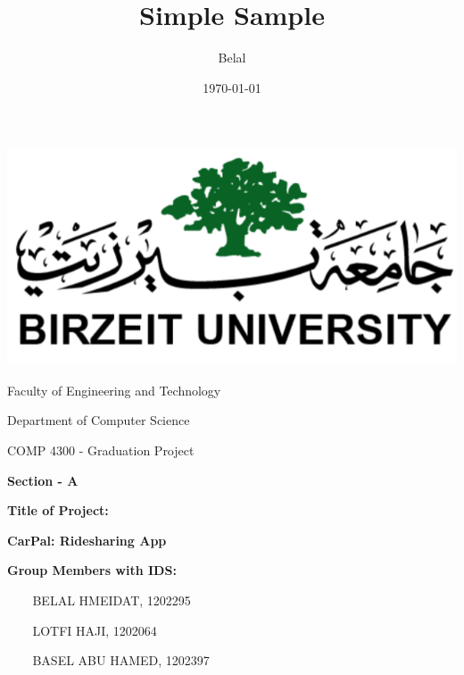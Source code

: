 \documentclass[a4paper, 12pt]{report} %
\title{Simple Sample} %
\author{Belal} %
\date{\today} %
\begin{document}
 
\setlength{\cftbeforetoctitleskip}{0pt plus 1pt} %
\setlength{\cftbeforeloftitleskip}{0pt plus 1pt} %
\setlength{\cftbeforelottitleskip}{0pt plus 1pt} %
    \begin{titlepage}
        \begin{center}
            \includegraphics{Birzeit_Logo.png}

            \Large{Faculty of Engineering and Technology}
            \vspace{0.8cm}

            Department of Computer Science 
            \vspace{0.8cm}

            COMP 4300 - Graduation Project
            \vspace{0.8cm}

            \textbf{\large{Section - A}}
            \vspace{0.8cm}
            
            \end{center}
            
            \textbf{\large{Title of Project:}}
            \vspace{0.4cm}
            
            \begin{center}
                \textbf{\Large{CarPal: Ridesharing App}}
            \end{center} 
            \vspace{0.8cm}
            
            \textbf{\large{Group Members with IDS:}}
            
            \hrulefill
            \begin{itemize}
                \item[$ $] BELAL HMEIDAT, 1202295 %
                \item[$ $] LOTFI HAJI, 1202064
                \item[$ $] BASEL ABU HAMED, 1202397
            \end{itemize}
            


\end{titlepage}
\end{document}
